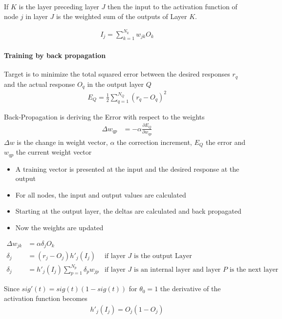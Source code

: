 If $K$ is the layer preceding layer $J$ then the input to the activation function of node $j$ in layer $J$ is the weighted sum of the outputs of Layer $K$.

\begin{align*}
I_j = \sum_{k=1}^{N_k}w_{jk}O_k
\end{align*}

\paragraph{Training by back propagation}
Target is to minimize the total squared error between the desired responses
$r_q$ and the actual response $O_q$ in the output layer $Q$
\begin{align*}
	E_Q = \frac{1}{2} \sum_{q=1}^{N_Q}(r_q-O_q)^2
\end{align*}

Back-Propagation is deriving the Error with respect to the weights
\begin{align*}
	\Delta w_{qp} &= -\alpha \frac{\partial E_Q}{\partial w_{qp}}
\end{align*}
$\Delta w$ is the change in weight vector, $\alpha$ the correction increment,
$E_Q$ the error and $w_{qp}$ the current weight vector

\begin{itemize}
\item A training vector is presented at
the input and the desired response
at the output
\item For all nodes, the input and output values are calculated
\item Starting at the output layer, the
deltas are calculated and back
propagated
\item Now the weights are updated
\end{itemize}


\begin{align*}
\Delta w_{jk} &= \alpha \delta_j O_k& \\
\delta_j &= (r_j-O_j) h'_j(I_j) & \text{if layer $J$ is the output Layer} \\
\delta_j &= h'_j(I_j) \sum_{p=1}^{N_p}\delta_p w_{jp} & \text{if layer $J$ is an internal layer and layer $P$ is the next layer}
\end{align*}

Since $sig'(t) = sig(t)(1-sig(t))$ for $\theta_0=1$ the derivative of the activation function becomes
\begin{align*}
h'_j(I_j) = O_j(1-O_j)
\end{align*}

